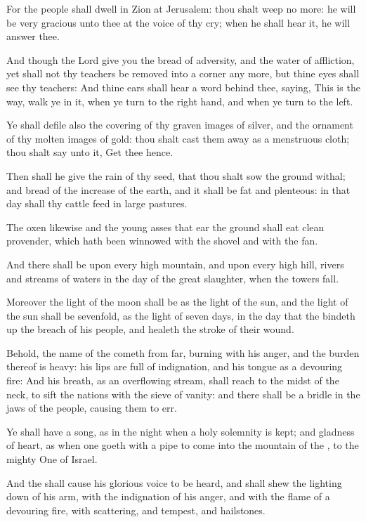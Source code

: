 \verse For the people shall dwell in Zion at Jerusalem: thou shalt weep no more: he will be very gracious unto thee at the voice of thy cry; when he shall hear it, he will answer thee.

\verse And though the Lord give you the bread of adversity, and the water of affliction, yet shall not thy teachers be removed into a corner any more, but thine eyes shall see thy teachers: \verse And thine ears shall hear a word behind thee, saying, This is the way, walk ye in it, when ye turn to the right hand, and when ye turn to the left.

\verse Ye shall defile also the covering of thy graven images of silver, and the ornament of thy molten images of gold: thou shalt cast them away as a menstruous cloth; thou shalt say unto it, Get thee hence.

\verse Then shall he give the rain of thy seed, that thou shalt sow the ground withal; and bread of the increase of the earth, and it shall be fat and plenteous: in that day shall thy cattle feed in large pastures.

\verse The oxen likewise and the young asses that ear the ground shall eat clean provender, which hath been winnowed with the shovel and with the fan.

\verse And there shall be upon every high mountain, and upon every high hill, rivers and streams of waters in the day of the great slaughter, when the towers fall.

\verse Moreover the light of the moon shall be as the light of the sun, and the light of the sun shall be sevenfold, as the light of seven days, in the day that the \LORD bindeth up the breach of his people, and healeth the stroke of their wound.

\verse Behold, the name of the \LORD cometh from far, burning with his anger, and the burden thereof is heavy: his lips are full of indignation, and his tongue as a devouring fire: \verse And his breath, as an overflowing stream, shall reach to the midst of the neck, to sift the nations with the sieve of vanity: and there shall be a bridle in the jaws of the people, causing them to err.

\verse Ye shall have a song, as in the night when a holy solemnity is kept; and gladness of heart, as when one goeth with a pipe to come into the mountain of the \LORD, to the mighty One of Israel.

\verse And the \LORD shall cause his glorious voice to be heard, and shall shew the lighting down of his arm, with the indignation of his anger, and with the flame of a devouring fire, with scattering, and tempest, and hailstones.

